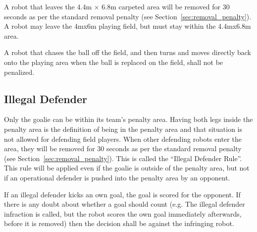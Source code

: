 \documentclass[12pt]{article}
\newcommand{\cf}{\mbox{cf.}\xspace}
\begin{document}
A robot that leaves the 4.4m $\times$ 6.8m carpeted area will be removed for 30
seconds as per the standard removal penalty (see
Section~\ref{sec:removal_penalty}).  A robot may leave the
4mx6m playing field, but must stay within the 4.4mx6.8m area.

A robot that chases the ball off the field, and then turns and moves
directly back onto the playing area when the ball is replaced on the
field, shall not be penalized.

\subsection{Illegal Defender}

Only the goalie can be within its team's penalty area. Having both
legs inside the penalty area is the definition of being in the
penalty area and that situation is not allowed for defending field
players.  When other defending robots enter the area, they will be
removed for 30 seconds as per the standard removal penalty (see
Section~\ref{sec:removal_penalty}).  This is called the ``Illegal
Defender Rule''.  This rule will be applied even if the goalie is
outside of the penalty area, but not if an operational defender is
pushed into the penalty area by an opponent.

If an illegal defender kicks an own goal, the goal is scored for the
opponent.  If there is any doubt about whether a goal should count
(e.g. The illegal defender infraction is called, but the robot scores
the own goal immediately afterwards, before it is removed) then the
decision shall be against the infringing robot.

% 
% 
% 
% 
\end{document}
